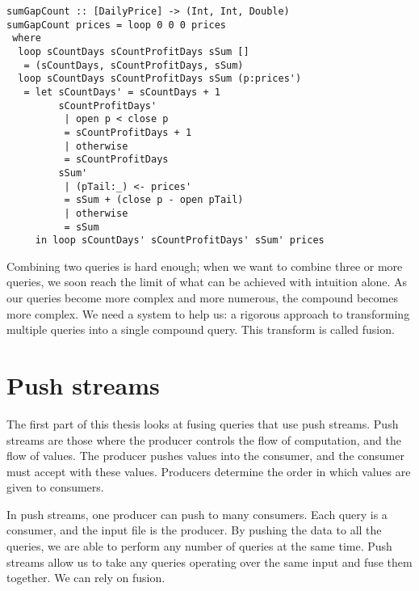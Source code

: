 \begin{lstlisting}
sumGapCount :: [DailyPrice] -> (Int, Int, Double)
sumGapCount prices = loop 0 0 0 prices
 where
  loop sCountDays sCountProfitDays sSum []
   = (sCountDays, sCountProfitDays, sSum)
  loop sCountDays sCountProfitDays sSum (p:prices')
   = let sCountDays' = sCountDays + 1
         sCountProfitDays'
          | open p < close p
          = sCountProfitDays + 1
          | otherwise
          = sCountProfitDays
         sSum'
          | (pTail:_) <- prices'
          = sSum + (close p - open pTail)
          | otherwise
          = sSum
     in loop sCountDays' sCountProfitDays' sSum' prices
\end{lstlisting}



% 


Combining two queries is hard enough; when we want to combine three or more queries, we soon reach the limit of what can be achieved with intuition alone.
As our queries become more complex and more numerous, the compound becomes more complex.
We need a system to help us: a rigorous approach to transforming multiple queries into a single compound query.
This transform is called fusion.

\section{Push streams}

The first part of this thesis looks at fusing queries that use push streams.
Push streams are those where the producer controls the flow of computation, and the flow of values.
The producer pushes values into the consumer, and the consumer must accept with these values.
Producers determine the order in which values are given to consumers.

In push streams, one producer can push to many consumers.
Each query is a consumer, and the input file is the producer.
By pushing the data to all the queries, we are able to perform any number of queries at the same time.
Push streams allow us to take any queries operating over the same input and fuse them together.
We can rely on fusion.

